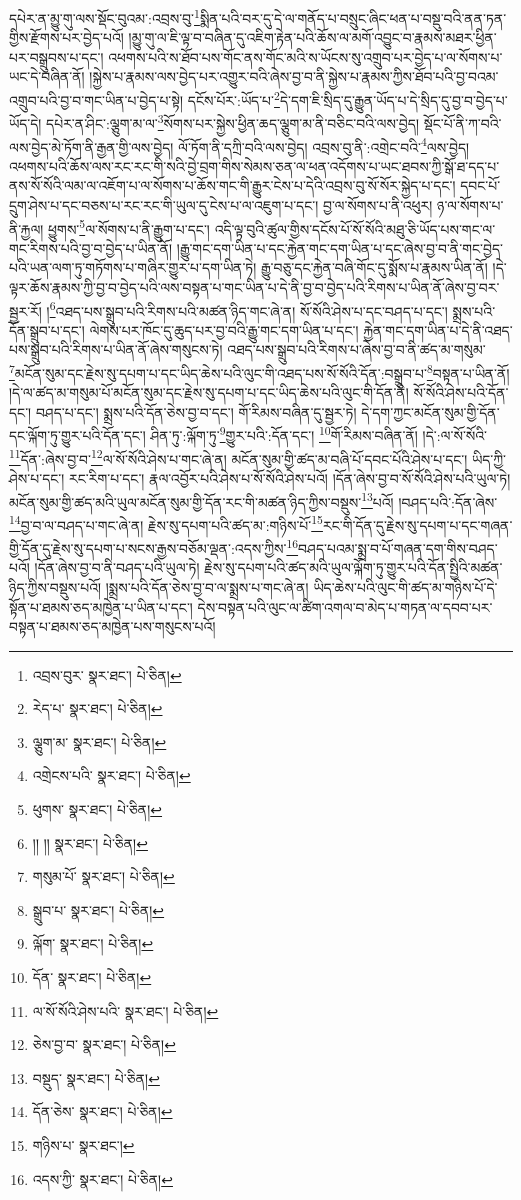 དཔེར་ན་མྱུ་གུ་ལས་སྡོང་བུའམ་:འབྲས་བུ་\footnote{འབྲས་བུར་  སྣར་ཐང་།  པེ་ཅིན། }སྨིན་པའི་བར་དུ་དེ་ལ་གནོད་པ་བསྲུང་ཞིང་ཕན་པ་བསྡུ་བའི་ནན་ཏན་གྱིས་རྫོགས་པར་བྱེད་པའོ། །མྱུ་གུ་ལ་ཇི་ལྟ་བ་བཞིན་དུ་འཇིག་རྟེན་པའི་ཆོས་ལ་མགོ་འབྱུང་བ་རྣམས་མཐར་ཕྱིན་པར་བསྒྲུབས་པ་དང་། འཕགས་པའི་ས་ཐོབ་པས་གོང་ནས་གོང་མའི་ས་ཡོངས་སུ་འགྲུབ་པར་བྱེད་པ་ལ་སོགས་པ་ཡང་དེ་བཞིན་ནོ། །སྐྱེས་པ་རྣམས་ལས་བྱེད་པར་འགྱུར་བའི་ཞེས་བྱ་བ་ནི་སྐྱེས་པ་རྣམས་ཀྱིས་ཐོབ་པའི་བྱ་བའམ་འགྲུབ་པའི་བྱ་བ་གང་ཡིན་པ་བྱེད་པ་སྟེ། དངོས་པོར་:ཡོད་པ་\footnote{རེད་པ་  སྣར་ཐང་།  པེ་ཅིན། }དེ་དག་ཇི་སྲིད་དུ་རྒྱུན་ཡོད་པ་དེ་སྲིད་དུ་བྱ་བ་བྱེད་པ་ཡོད་དེ། དཔེར་ན་ཤིང་:ལྕུག་མ་ལ་\footnote{ལྕུག་མ་  སྣར་ཐང་།  པེ་ཅིན། }སོགས་པར་སྐྱེས་ཕྱིན་ཆད་ལྕུག་མ་ནི་བཅིང་བའི་ལས་བྱེད། སྡོང་པོ་ནི་ཀ་བའི་ལས་བྱེད་མེ་ཏོག་ནི་རྒྱན་གྱི་ལས་བྱེད། ལོ་ཏོག་ནི་དཀྲི་བའི་ལས་བྱེད། འབྲས་བུ་ནི་:འགྲེང་བའི་\footnote{འགྲེངས་པའི་  སྣར་ཐང་།  པེ་ཅིན། }ལས་བྱེད། འཕགས་པའི་ཆོས་ལས་རང་རང་གི་སའི་བྱེ་བྲག་གིས་སེམས་ཅན་ལ་ཕན་འདོགས་པ་ཡང་ཐབས་ཀྱི་སྒོ་ཐ་དད་པ་ནས་སོ་སོའི་ལམ་ལ་འཇོག་པ་ལ་སོགས་པ་ཆོས་གང་གི་རྒྱུར་ངེས་པ་དེའི་འབྲས་བུ་སོ་སོར་སྐྱེད་པ་དང་། དབང་པོ་དྲུག་ཤེས་པ་དང་བཅས་པ་རང་རང་གི་ཡུལ་དུ་ངེས་པ་ལ་འཇུག་པ་དང་། བྱ་ལ་སོགས་པ་ནི་འཕུར། ཉ་ལ་སོགས་པ་ནི་རྐྱལ། ཕྱུགས་\footnote{ཕུགས་  སྣར་ཐང་།  པེ་ཅིན། }ལ་སོགས་པ་ནི་རྒྱུག་པ་དང་། འདི་ལྟ་བུའི་ཚུལ་གྱིས་དངོས་པོ་སོ་སོའི་མཐུ་ཅི་ཡོད་པས་གང་ལ་གང་རིགས་པའི་བྱ་བ་བྱེད་པ་ཡིན་ནོ། །རྒྱུ་གང་དག་ཡིན་པ་དང་རྐྱེན་གང་དག་ཡིན་པ་དང་ཞེས་བྱ་བ་ནི་གང་བྱེད་པའི་ཡན་ལག་ཏུ་གཏོགས་པ་གཞིར་གྱུར་པ་དག་ཡིན་ཏེ། རྒྱུ་བཅུ་དང་རྐྱེན་བཞི་གོང་དུ་སྨོས་པ་རྣམས་ཡིན་ནོ། །དེ་ལྟར་ཆོས་རྣམས་ཀྱི་བྱ་བ་བྱེད་པའི་ལས་བསྟན་པ་གང་ཡིན་པ་དེ་ནི་བྱ་བ་བྱེད་པའི་རིགས་པ་ཡིན་ནོ་ཞེས་བྱ་བར་སྦྱར་རོ། །\footnote{།། །།  སྣར་ཐང་།  པེ་ཅིན། }འཐད་པས་སྒྲུབ་པའི་རིགས་པའི་མཚན་ཉིད་གང་ཞེ་ན། སོ་སོའི་ཤེས་པ་དང་བཤད་པ་དང་། སྨྲས་པའི་དོན་སྒྲུབ་པ་དང་། ལེགས་པར་ཁོང་དུ་ཆུད་པར་བྱ་བའི་རྒྱུ་གང་དག་ཡིན་པ་དང་། རྐྱེན་གང་དག་ཡིན་པ་དེ་ནི་འཐད་པས་སྒྲུབ་པའི་རིགས་པ་ཡིན་ནོ་ཞེས་གསུངས་ཏེ། འཐད་པས་སྒྲུབ་པའི་རིགས་པ་ཞེས་བྱ་བ་ནི་ཚད་མ་གསུམ་\footnote{གསུམ་པོ་  སྣར་ཐང་།  པེ་ཅིན། }མངོན་སུམ་དང་རྗེས་སུ་དཔག་པ་དང་ཡིད་ཆེས་པའི་ལུང་གི་འཐད་པས་སོ་སོའི་དོན་:བསྒྲུབ་པ་\footnote{སྒྲུབ་པ་  སྣར་ཐང་།  པེ་ཅིན། }བསྟན་པ་ཡིན་ནོ། །དེ་ལ་ཚད་མ་གསུམ་པོ་མངོན་སུམ་དང་རྗེས་སུ་དཔག་པ་དང་ཡིད་ཆེས་པའི་ལུང་གི་དོན་ནི། སོ་སོའི་ཤེས་པའི་དོན་དང་། བཤད་པ་དང་། སྨྲས་པའི་དོན་ཅེས་བྱ་བ་དང་། གོ་རིམས་བཞིན་དུ་སྦྱར་ཏེ། དེ་དག་ཀྱང་མངོན་སུམ་གྱི་དོན་དང་ལྐོག་ཏུ་གྱུར་པའི་དོན་དང་། ཤིན་ཏུ་:ལྐོག་ཏུ་\footnote{ལྐོག་  སྣར་ཐང་།  པེ་ཅིན། }གྱུར་པའི་:དོན་དང་། \footnote{དོན་  སྣར་ཐང་།  པེ་ཅིན། }གོ་རིམས་བཞིན་ནོ། །དེ་:ལ་སོ་སོའི་\footnote{ལ་སོ་སོའི་ཤེས་པའི་  སྣར་ཐང་།  པེ་ཅིན། }དོན་:ཞེས་བྱ་བ་\footnote{ཅེས་བྱ་བ་  སྣར་ཐང་།  པེ་ཅིན། }ལ་སོ་སོའི་ཤེས་པ་གང་ཞེ་ན། མངོན་སུམ་གྱི་ཚད་མ་བཞི་པོ་དབང་པོའི་ཤེས་པ་དང་། ཡིད་ཀྱི་ཤེས་པ་དང་། རང་རིག་པ་དང་། རྣལ་འབྱོར་པའི་ཤེས་པ་སོ་སོའི་ཤེས་པའོ། །དོན་ཞེས་བྱ་བ་སོ་སོའི་ཤེས་པའི་ཡུལ་ཏེ། མངོན་སུམ་གྱི་ཚད་མའི་ཡུལ་མངོན་སུམ་གྱི་དོན་རང་གི་མཚན་ཉིད་ཀྱིས་བསྡུས་\footnote{བསྡུད་  སྣར་ཐང་།  པེ་ཅིན། }པའོ། །བཤད་པའི་:དོན་ཞེས་\footnote{དོན་ཅེས་  སྣར་ཐང་།  པེ་ཅིན། }བྱ་བ་ལ་བཤད་པ་གང་ཞེ་ན། རྗེས་སུ་དཔག་པའི་ཚད་མ་:གཉིས་པོ་\footnote{གཉིས་པ་  སྣར་ཐང་། }རང་གི་དོན་དུ་རྗེས་སུ་དཔག་པ་དང་གཞན་གྱི་དོན་དུ་རྗེས་སུ་དཔག་པ་སངས་རྒྱས་བཅོམ་ལྡན་:འདས་ཀྱིས་\footnote{འདས་ཀྱི་  སྣར་ཐང་།  པེ་ཅིན། }བཤད་པའམ་སྨྲ་བ་པོ་གཞན་དག་གིས་བཤད་པའོ། །དོན་ཞེས་བྱ་བ་ནི་བཤད་པའི་ཡུལ་ཏེ། རྗེས་སུ་དཔག་པའི་ཚད་མའི་ཡུལ་ལྐོག་ཏུ་གྱུར་པའི་དོན་སྤྱིའི་མཚན་ཉིད་ཀྱིས་བསྡུས་པའོ། །སྨྲས་པའི་དོན་ཅེས་བྱ་བ་ལ་སྨྲས་པ་གང་ཞེ་ན། ཡིད་ཆེས་པའི་ལུང་གི་ཚད་མ་གཉིས་པོ་དེ་སྟོན་པ་ཐམས་ཅད་མཁྱེན་པ་ཡིན་པ་དང་། དེས་བསྟན་པའི་ལུང་ལ་ཚིག་འགལ་བ་མེད་པ་གཏན་ལ་དབབ་པར་བསྟན་པ་ཐམས་ཅད་མཁྱེན་པས་གསུངས་པའོ། 